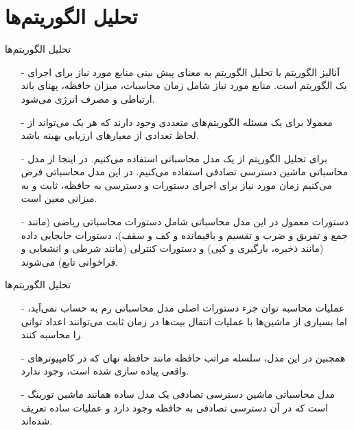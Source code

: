\section{تحلیل الگوریتم‌ها}

\begin{frame}{‌تحلیل الگوریتم‌ها}
\begin{itemize}\itemr
\item[-]
آنالیز الگوریتم یا تحلیل الگوریتم
به معنای پیش بینی منابع مورد نیاز برای اجرای یک الگوریتم است.
منابع مورد نیاز شامل زمان محاسبات، میزان حافظه، پهنای باند ارتباطی و مصرف انرژی می‌شود.
\item[-]
معمولا برای یک مسئله الگوریتم‌های متعددی وجود دارند که هر یک می‌تواند از لحاظ تعدادی از معیارهای ارزیابی بهینه باشد.
\item[-]
برای تحلیل الگوریتم از یک مدل محاسباتی استفاده می‌کنیم. در اینجا از مدل محاسباتی ماشین دسترسی تصادفی
استفاده می‌کنیم. در این مدل محاسباتی فرض می‌کنیم زمان مورد نیاز برای اجرای دستورات و دسترسی به حافظه، ثابت و به میزانی معین است.
\item[-]
دستورات معمول در این مدل محاسباتی شامل دستورات محاسباتی ریاضی (مانند جمع و تفریق و ضرب و تقسیم و باقیمانده و کف و سقف)، دستورات جابجایی داده (مانند ذخیره، بارگیری و کپی) و دستورات کنترلی (مانند شرطی و انشعابی و فراخوانی تابع) می‌شوند.
\end{itemize}
\end{frame}


\begin{frame}{‌تحلیل الگوریتم‌ها}
\begin{itemize}\itemr
\item[-]
عملیات محاسبه توان جزء دستورات اصلی مدل محاسباتی رم به حساب نمی‌آید، اما بسیاری از ماشین‌ها با عملیات انتقال بیت‌ها در زمان ثابت می‌توانند اعداد توانی را محاسبه کنند.
\item[-]
همچنین در این مدل، سلسله مراتب حافظه مانند حافظه نهان
که در کامپیوترهای واقعی پیاده سازی شده است، وجود ندارد.
\item[-]
مدل محاسباتی ماشین دسترسی تصادفی یک مدل ساده همانند ماشین تورینگ است که در آن دسترسی تصادفی به حافظه وجود دارد و عملیات ساده تعریف شده‌اند.
\end{itemize}
\end{frame}

